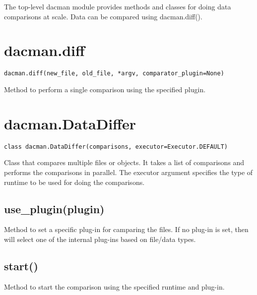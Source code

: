 The top-level dacman module provides methods and classes for doing
data comparisons at scale. Data can be compared using dacman.diff().

\section{dacman.diff}
\texttt{dacman.diff(new\_file, old\_file, *argv, comparator\_plugin=None)}

Method to perform a single comparison using the specified plugin.


\section{dacman.DataDiffer}
\texttt{class dacman.DataDiffer(comparisons, executor=Executor.DEFAULT)}

Class that compares multiple files or objects. It takes
a list of comparisons and performs the comparisons in
parallel. The executor argument specifies the type of
runtime to be used for doing the comparisons.

\subsection{use\_plugin(plugin)}

Method to set a specific plug-in for camparing the files.
If no plug-in is set, then \systemname will select one
of the internal plug-ins based on file/data types.

\subsection{start()}

Method to start the comparison using the specified runtime and
plug-in. 

